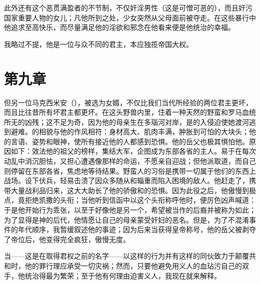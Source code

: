 此外还有这个恶贯满盈者的不节制，不仅奸淫男性（这是可憎可恶的），而且奸污国家重要人物的女儿；凡他所到之处，少女突然从父母面前被夺走。在这些暴行中他追求至高快乐，而尽量满足他的淫欲和邪念在他看来便是他统治的幸福。\par

我略过不提，他是一位与众不同的君主，本应独揽帝国大权。\par


\section{第九章}

但另一位马克西米安（），被选为女婿，不仅比我们当代所经验的两位君主更坏，而且比往昔所有坏君主都更坏。在这头野兽内里，住着一种天然的野蛮和罗马血统所无的凶残；这不足为奇，因为他的母亲生在多瑙河对岸，是的入侵迫使她渡河逃到避难。的相貌与他的作风相符：身材高大、肌肉丰满，肿胀到可怕的大块头；他的言语、姿势和眼神，使所有接近他的人都感到恐惧。他的岳父也极其惧怕他。原因如下：效法他的祖父的榜样，集结大军，企图成为东部各省的主人。易于在每次动乱中消沉胆怯，又担心遭遇像那样的命运，不愿亲自迎战；但他派取道，而自己则停留在东部各省，焦虑地等待结果。野蛮人的习俗是携带一切属于他们的东西上战场。设下伏兵，轻易击溃了因众多随从和辎重而陷入困境的敌人。他赶走了，携带大量战利品归来，这大大助长了他的骄傲和的恐惧。因为此役之后，他傲慢到极点，竟拒绝凯撒的头衔；当他听到信函中以这个头衔称呼他时，便厉色凶声喊道：于是他开始行为乖张，以至于好像他是另一个，希望被当作的后裔并被称为如此；为了显得是神的后代，他情愿让自己的母亲蒙受奸妇的恶名。但是，为了不混淆事件的年代顺序，我暂缓叙述他的事迹；因为后来当获得皇帝称号，他的岳父被剥夺了帝位后，他变得完全疯狂，傲慢无度。\par

当——这是在取得君权之前的名字——以这样的行为并有这样的同伙致力于颠覆共和时，他的罪行理应承受一切灾祸；然而，只要他避免用义人的血玷污自己的双手，他统治得最为繁荣；至于他有何理由迫害义人，我现在就来解释。\par

